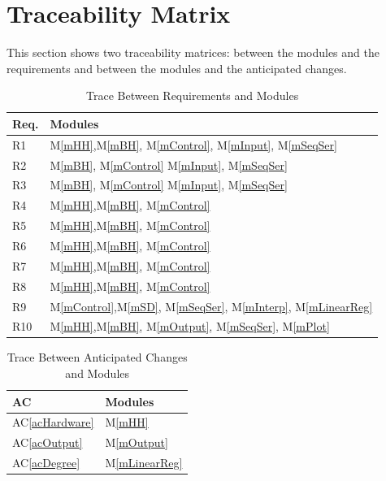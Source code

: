 \documentclass[12pt, titlepage]{article}
\newcommand{\acref}[1]{AC\ref{#1}}
\newcommand{\mref}[1]{M\ref{#1}}
\begin{document}
\section{Traceability Matrix} \label{SecTM}

This section shows two traceability matrices: between the modules and the
requirements and between the modules and the anticipated changes.

\begin{table}[H]
\centering
\begin{tabular}{p{} p{}}
\toprule
\textbf{Req.} & \textbf{Modules}\\
\midrule
R1 & \mref{mHH},\mref{mBH}, \mref{mControl}, \mref{mInput}, \mref{mSeqSer} \\
R2 & \mref{mBH}, \mref{mControl} \mref{mInput}, \mref{mSeqSer}\\
R3 & \mref{mBH}, \mref{mControl} \mref{mInput}, \mref{mSeqSer}\\
R4 & \mref{mHH},\mref{mBH}, \mref{mControl}\\
R5 & \mref{mHH},\mref{mBH}, \mref{mControl}\\ 
R6 & \mref{mHH},\mref{mBH}, \mref{mControl}\\
R7 & \mref{mHH},\mref{mBH}, \mref{mControl}\\
R8 & \mref{mHH},\mref{mBH}, \mref{mControl}\\
R9 & \mref{mControl},\mref{mSD}, \mref{mSeqSer}, \mref{mInterp}, \mref{mLinearReg}\\
R10 & \mref{mHH},\mref{mBH}, \mref{mOutput}, \mref{mSeqSer}, \mref{mPlot}\\

\bottomrule
\end{tabular}
\caption{Trace Between Requirements and Modules}
\label{TblRT}
\end{table}

\begin{table}[H]
\centering
\begin{tabular}{p{} p{}}
\toprule
\textbf{AC} & \textbf{Modules}\\
\midrule
\acref{acHardware} & \mref{mHH}\\
\acref{acOutput} & \mref{mOutput}\\
\acref{acDegree} & \mref{mLinearReg}\\
\bottomrule
\end{tabular}
\caption{Trace Between Anticipated Changes and Modules}
\label{TblACT}
\end{table}
\end{document}
